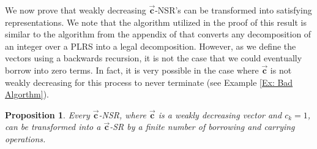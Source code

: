 \documentclass[]{interact}
\newcommand{\vtr}[1]{\vec{\mathbf{#1}}}
\theoremstyle{plain}
\numberwithin{equation}{section} %
\newtheorem{proposition}[thm]{Proposition}
\numberwithin{table}{section} %
\numberwithin{figure}{section}
\begin{document}
We now prove that weakly decreasing $\vtr{c}$-NSR's can be transformed into satisfying representations. We note that the algorithm utilized in the proof of this result is similar to the algorithm from the appendix of \textcolor{blue}{\cite{KKMW11}} that converts any decomposition of an integer over a PLRS into a legal decomposition. However, as we define the vectors using a backwards recursion, it is not the case that we could eventually borrow into zero terms. In fact, it is very possible in the case where $\vtr{c}$ is not weakly decreasing for this process to never terminate (see Example \textcolor{blue}{\ref{Ex: Bad Algorthm}}).

\begin{proposition}\label{prop: general cSR}
Every $\vtr{c}$-NSR, where $\vtr{c}$ is a weakly decreasing vector and $c_k = 1$, can be transformed into a $\vtr{c}$-SR by a finite number of borrowing and carrying operations.
\end{proposition}
\end{document}
